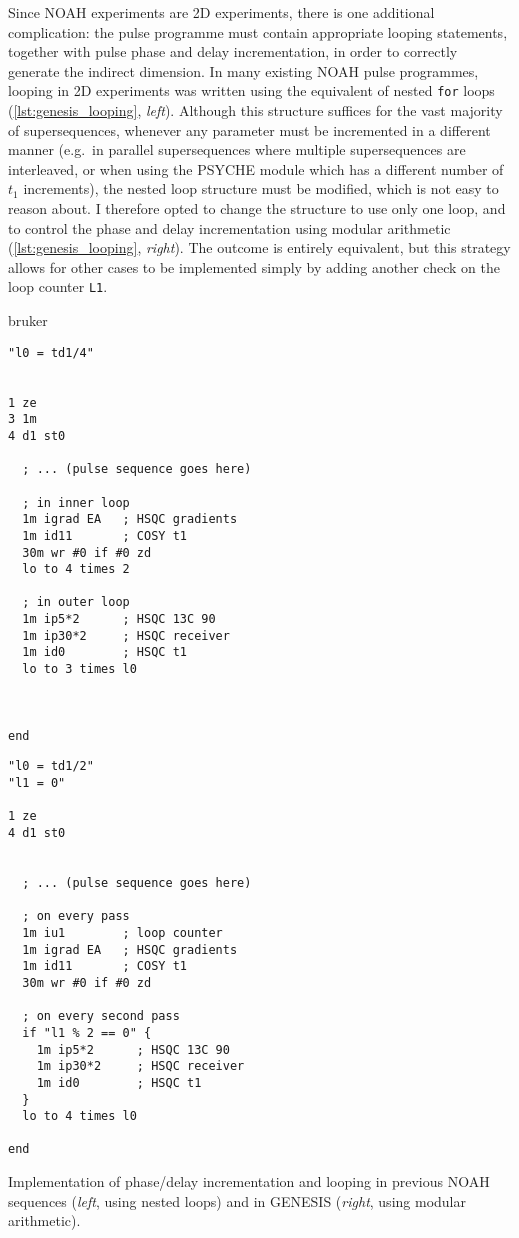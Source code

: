 Since NOAH experiments are 2D experiments, there is one additional complication: the pulse programme must contain appropriate looping statements, together with pulse phase and delay incrementation, in order to correctly generate the indirect dimension.
In many existing NOAH pulse programmes, looping in 2D experiments was written using the equivalent of nested \texttt{for} loops (\cref{lst:genesis_looping}, \textit{left}).
Although this structure suffices for the vast majority of supersequences, whenever any parameter must be incremented in a different manner (e.g.\ in parallel supersequences where multiple supersequences are interleaved, or when using the PSYCHE module which has a different number of $t_1$ increments), the nested loop structure must be modified, which is not easy to reason about.
I therefore opted to change the structure to use only one loop, and to control the phase and delay incrementation using modular arithmetic (\cref{lst:genesis_looping}, \textit{right}).
The outcome is entirely equivalent, but this strategy allows for other cases to be implemented simply by adding another check on the loop counter \texttt{L1}.

\begin{mylisting}[!ht] %
\begin{tcbmintedsbs}{bruker}
\begin{verbatim}
"l0 = td1/4"


1 ze
3 1m
4 d1 st0

  ; ... (pulse sequence goes here)

  ; in inner loop
  1m igrad EA   ; HSQC gradients
  1m id11       ; COSY t1
  30m wr #0 if #0 zd
  lo to 4 times 2

  ; in outer loop
  1m ip5*2      ; HSQC 13C 90
  1m ip30*2     ; HSQC receiver
  1m id0        ; HSQC t1
  lo to 3 times l0



end
\end{verbatim}
\tcblower
\begin{verbatim}
"l0 = td1/2"
"l1 = 0"

1 ze
4 d1 st0


  ; ... (pulse sequence goes here)

  ; on every pass
  1m iu1        ; loop counter
  1m igrad EA   ; HSQC gradients
  1m id11       ; COSY t1
  30m wr #0 if #0 zd

  ; on every second pass
  if "l1 % 2 == 0" {
    1m ip5*2      ; HSQC 13C 90
    1m ip30*2     ; HSQC receiver
    1m id0        ; HSQC t1
  }
  lo to 4 times l0

end
\end{verbatim}
\end{tcbmintedsbs}
    \caption[GENESIS implementation of looping]{Implementation of phase/delay incrementation and looping in previous NOAH sequences (\textit{left}, using nested loops) and in GENESIS (\textit{right}, using modular arithmetic).}
    \label{lst:genesis_looping}
\end{mylisting} %


